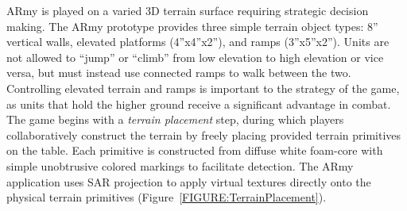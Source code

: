 \documentclass[10pt,twocolumn,letterpaper]{article}
\begin{document}
ARmy is played on a varied 3D terrain
surface requiring strategic decision making. The ARmy prototype
provides three simple terrain object types: 8'' vertical walls,
elevated platforms (4''x4''x2''), and ramps (3''x5''x2'').
Units are not allowed to ``jump'' or ``climb'' from low elevation to
high elevation or vice versa, but must instead use connected ramps
to walk between the two.  Controlling elevated terrain and
ramps is important to the strategy of the game, as units that hold the
higher ground receive a significant advantage in combat.
%
%
The game begins with a \emph{terrain placement} step, during which
players collaboratively construct the terrain by freely placing
provided terrain primitives on the table.
Each primitive is constructed
from diffuse white foam-core with simple unobtrusive colored markings
to facilitate detection.
%
%
The ARmy application uses SAR projection
to apply virtual textures directly onto the physical terrain
primitives (Figure~\ref{FIGURE:TerrainPlacement}).
\end{document}
